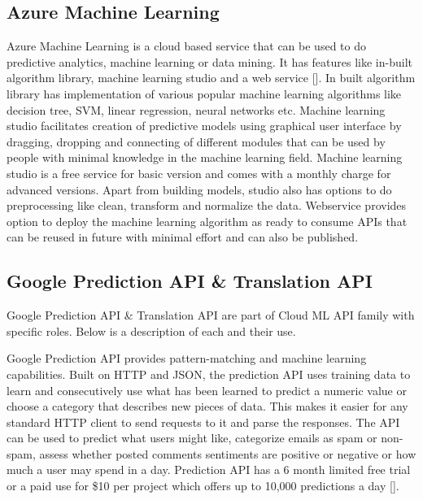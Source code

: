 \subsection{Azure Machine Learning}
    
Azure Machine Learning is a cloud based service that can be used to do
predictive analytics, machine learning or data mining. It has features
like in-built algorithm library, machine learning studio and a web
service [\cite{www-azureMLSite}]. In built algorithm library has
implementation of various popular machine learning algorithms like
decision tree, SVM, linear regression, neural networks etc. Machine
learning studio facilitates creation of predictive models using
graphical user interface by dragging, dropping and connecting of
different modules that can be used by people with minimal knowledge in
the machine learning field. Machine learning studio is a free service
for basic version and comes with a monthly charge for advanced
versions. Apart from building models, studio also has options to do
preprocessing like clean, transform and normalize the data. Webservice
provides option to deploy the machine learning algorithm as ready to
consume APIs that can be reused in future with minimal effort and can
also be published.
    
\subsection{Google Prediction API \& Translation API}

Google Prediction API \& Translation API are part of Cloud ML API
family with specific roles. Below is a description of each and their
use.

Google Prediction API provides pattern-matching and machine learning
capabilities. Built on HTTP and JSON, the prediction API uses training
data to learn and consecutively use what has been learned to predict a
numeric value or choose a category that describes new pieces of
data. This makes it easier for any standard HTTP client to send
requests to it and parse the responses. The API can be used to predict
what users might like, categorize emails as spam or non-spam, assess
whether posted comments sentiments are positive or negative or how
much a user may spend in a day. Prediction API has a 6 month limited
free trial or a paid use for \$10 per project which offers up to
10,000 predictions a day [\cite{www-prediction}].

